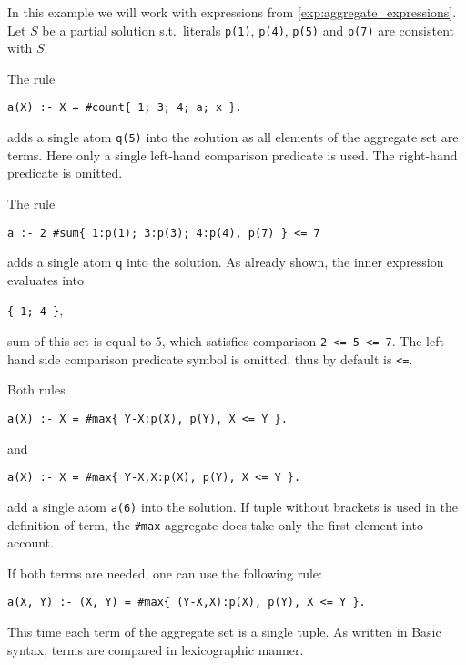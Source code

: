 \begin{example}
    In this example we will work with expressions from \cref{exp:aggregate_expressions}.
    Let $S$ be a partial solution s.t.\ literals \texttt{p(1)}, \texttt{p(4)},
    \texttt{p(5)} and \texttt{p(7)} are consistent with $S$.

    The rule
    \begin{center}
        \texttt{a(X) :- X = \#count\{ 1; 3; 4; a; x \}.}  %
    \end{center}
    adds a single atom \texttt{q(5)} into the solution as all
    elements of the aggregate set are terms.
    Here only a single left-hand comparison predicate is used. The right-hand
    predicate is omitted.

    The rule
    \begin{center}
        \texttt{a :- 2 \#sum\{ 1:p(1); 3:p(3); 4:p(4), p(7) \} <= 7}  %
    \end{center}
    adds a single atom \texttt{q} into the solution.
    As already shown, the inner expression evaluates into
    \begin{center}
        \texttt{\{ 1; 4 \}},  %
    \end{center}
    sum of this set is equal to 5, which satisfies comparison \texttt{2 <= 5 <= 7}.
    The left-hand side comparison predicate symbol is omitted, thus by default is \texttt{<=}.

    Both rules
    \begin{center}
        \texttt{a(X) :- X = \#max\{ Y-X:p(X), p(Y), X <= Y \}.}  %
    \end{center}
    and
    \begin{center}
        \texttt{a(X) :- X = \#max\{ Y-X,X:p(X), p(Y), X <= Y \}.}  %
    \end{center}
    add a single atom \texttt{a(6)} into the solution. If tuple without brackets
    is used in the definition of term, the \texttt{\#max} aggregate does take only
    the first element into account.

    If both terms are needed, one can use the following rule:
    \begin{center}
        \texttt{a(X, Y) :- (X, Y) = \#max\{ (Y-X,X):p(X), p(Y), X <= Y \}.}  %
    \end{center}
    This time each term of the aggregate set is a single tuple.
    As written in Basic syntax, terms are compared in lexicographic manner.
\end{example}

